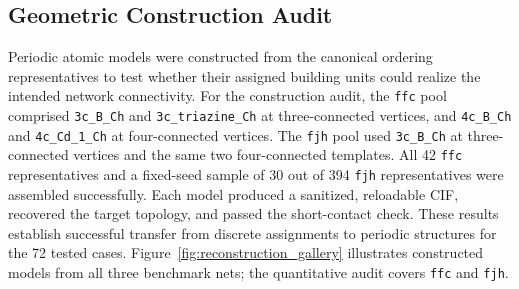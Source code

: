 \documentclass[a5paper, 10pt]{article}
\begin{document}
\subsection{Geometric Construction Audit}
\label{sec:reconstruction}

Periodic atomic models were constructed from the canonical ordering representatives to test whether their assigned building units could realize the intended network connectivity. For the construction audit, the \texttt{ffc} pool comprised \texttt{3c\_B\_Ch} and \texttt{3c\_triazine\_Ch} at three-connected vertices, and \texttt{4c\_B\_Ch} and \texttt{4c\_Cd\_1\_Ch} at four-connected vertices. The \texttt{fjh} pool used \texttt{3c\_B\_Ch} at three-connected vertices and the same two four-connected templates. All 42 \texttt{ffc} representatives and a fixed-seed sample of 30 out of 394 \texttt{fjh} representatives were assembled successfully. Each model produced a sanitized, reloadable CIF, recovered the target topology, and passed the short-contact check. These results establish successful transfer from discrete assignments to periodic structures for the 72 tested cases. Figure~\ref{fig:reconstruction_gallery} illustrates constructed models from all three benchmark nets; the quantitative audit covers \texttt{ffc} and \texttt{fjh}.
\end{document}
